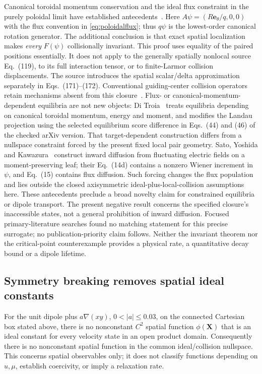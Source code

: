 \documentclass[11pt,letterpaper]{article}
\newcommand{\X}{\mathbf X}
\begin{document}
Canonical toroidal momentum conservation and the ideal flux constraint in
the purely poloidal limit have established antecedents~\cite{TB15}.
Here $A\psi=(R\mathbf e_\theta/q,0,0)$ with the flux convention in
\eqref{eq:poloidalflux}; thus $q\psi$ is the lowest-order canonical rotation
generator. The additional conclusion is that exact spatial localization
makes \emph{every} $F(\psi)$ collisionally invariant. This proof uses equality
of the paired positions essentially. It does not apply to the generally
spatially nonlocal source Eq.~(119), to its full interaction tensor, or to
finite-Larmor collision displacements. The source introduces the spatial
scalar/delta approximation separately in Eqs.~(171)--(172).
Conventional guiding-center collision operators retain mechanisms absent
from this closure~\cite{B04,BS25}.
Flux- or canonical-momentum-dependent equilibria are not new objects:
Di Troia~\cite{DT15} treats equilibria depending on canonical toroidal
momentum, energy and moment, and modifies the Landau projection using the
selected equilibrium score difference in Eqs.~(44) and (46) of the checked
arXiv version. That target-dependent construction differs from a nullspace
constraint forced by the present fixed local pair geometry.
Sato, Yoshida and Kawazura~\cite{SYK15} construct inward diffusion from
fluctuating electric fields on a moment-preserving leaf; their Eq.~(14d)
contains a nonzero Wiener increment in $\psi$, and Eq.~(15) contains flux
diffusion. Such forcing changes the flux population and lies outside the
closed axisymmetric ideal-plus-local-collision assumptions here.
These antecedents preclude a broad novelty claim for constrained equilibria
or dipole transport. The present negative result concerns the specified
closure's inaccessible states, not a general prohibition of inward diffusion.
 Focused primary-literature searches found
no matching statement for this precise surrogate; no publication-priority
claim follows. Neither the invariant theorem nor the critical-point
counterexample provides a physical rate, a quantitative decay bound or a
dipole lifetime.

\subsection*{Symmetry breaking removes spatial ideal constants}
For the unit dipole plus $a\nabla(xy)$, $0<|a|\le0.03$, on the connected
Cartesian box stated above, there is no nonconstant $C^2$ spatial function
$\phi(\X)$ that is an ideal constant for every velocity state in an open
product domain. Consequently there is no nonconstant spatial function in
the common ideal/collision nullspace. This concerns spatial observables
only; it does not classify functions depending on $u,\mu$, establish
coercivity, or imply a relaxation rate.
\end{document}
